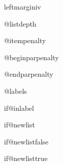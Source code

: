 \begin{docCommand} {leftmarginiv} { }
\end{docCommand}
\begin{teX}
\newdimen\leftmarginiv
\end{teX}
    \begin{teX}
\newdimen\leftmarginv
    \end{teX}


\begin{docCommand}{@listdepth}{}
\end{docCommand}
\begin{docCommand}{@itempenalty}{}
\end{docCommand}
\begin{docCommand}{@beginparpenalty}{}
\end{docCommand}
\begin{docCommand}{@endparpenalty}{}
\end{docCommand}
    \begin{teX}
\newcount\@listdepth {}
\newcount\@itempenalty
\newcount\@beginparpenalty
\newcount\@endparpenalty
    \end{teX}


 \begin{docCommand}{@labels} {  }
 \end{docCommand}
    \begin{teX}
\newbox\@labels
    \end{teX}
 


 \begin{docCommand}{if@inlabel}{}
  \end{docCommand}
    \begin{teX}
\newif\if@inlabel \@inlabelfalse
    \end{teX}



\begin{docCommand}{ if@newlist} { }
\end{docCommand}
  \begin{teX}
\newif\if@newlist   \@newlistfalse
    \end{teX}
  
  \begin{docCommand}{if@newlistfalse }{}
  \end{docCommand}
  \begin{docCommand}{if@newlisttrue }{}
  \end{docCommand}
 
  
 

